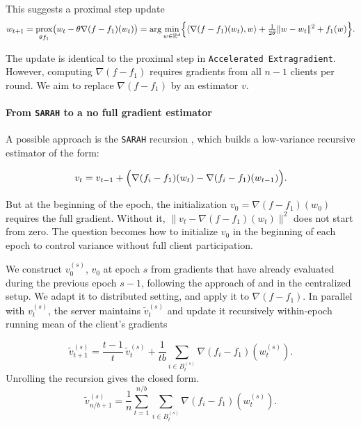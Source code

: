 \documentclass{article}
\DeclareMathOperator{\prox}{prox}
\begin{document}
This suggests a proximal step update 
\begin{equation*}
\label{eq:ideal_update}
    w_{t+1} = \prox_{\theta f_1}\bigl(w_t - \theta \nabla(f - f_1)(w_t)\bigr)
    = \arg\min_{w \in \mathbb{R}^d} \Bigl\{\langle \nabla(f - f_1)(w_t), w \rangle 
    + \tfrac{1}{2\theta}\|w - w_t\|^2 + f_1(w)\Bigr\}.
\end{equation*}

The update is identical to the proximal step in \texttt{Accelerated Extragradient}. However, computing $\nabla(f-f_1)$ requires gradients from all $n-1$ clients per round. We aim to replace $\nabla (f - f_1)$ by an estimator $v$. 

\paragraph{From \texttt{SARAH} to a no full gradient estimator}
A possible approach is the \texttt{SARAH} recursion \cite{nguyen2017sarah}, which builds a low-variance recursive estimator of the form: 

\begin{equation}
\label{eq:sarah_recursion}
    v_t = v_{t-1} + \Bigl(
    \nabla(f_i - f_1)(w_t) - \nabla(f_i - f_1)(w_{t-1})\Bigr).
\end{equation}

But at the beginning of the epoch, the initialization $v_0 = \nabla (f-f_1)(w_0)$ requires the full gradient. Without it, $\|v_t - \nabla(f - f_1)(w_t)\|^2$ does not start from zero. The question becomes how to initialize $v_0$ in the beginning of each epoch to control variance without full client participation. 

We construct $v^{(s)}_0$, $v_0$ at epoch $s$ from gradients that have already evaluated during the previous epoch $s-1$, following the approach of \cite{beznosikov2024random} and \cite{medyakov2025variance} in the centralized setup. We adapt it to distributed setting, and apply it to $\nabla (f - f_1)$. In parallel with $v^{(s)}_t$, the server maintains $\tilde v_t^{(s)}$ and update it recursively within-epoch running mean of the client's gradients 

\begin{equation}
\label{eq:bridge_update}
    \tilde v_{t+1}^{(s)} = \frac{t-1}{t}\,\tilde v_t^{(s)} 
    + \frac{1}{tb}\sum_{i \in B_t^{(s)}} \nabla(f_i - f_1)(w_t^{(s)}).
\end{equation}
Unrolling the recursion gives the closed form.
\begin{equation}
\label{eq:bridge_main_update}
    \tilde v_{n/b+1}^{(s)} = \frac{1}{n}\sum_{t=1}^{n/b}\sum_{i \in B_t^{(s)}}
    \nabla(f_i - f_1)(w_t^{(s)}).
\end{equation}
\end{document}
